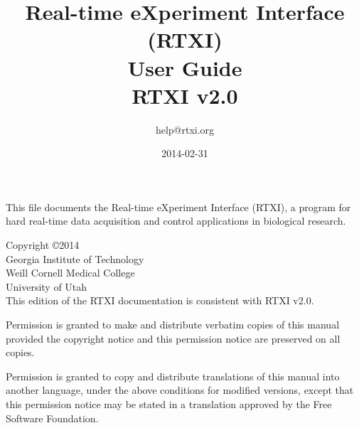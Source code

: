 \documentclass[twoside,letter]{refrep}
\title{Real-time eXperiment Interface (RTXI) \\User Guide\\
{\large RTXI v2.0}}
\author{help@rtxi.org}
\date{2014-02-31}
\begin{document}
\maketitle

This file documents the Real-time eXperiment Interface (RTXI), a program for hard real-time data acquisition and control applications in biological research.

Copyright \copyright 2014\\
Georgia Institute of Technology\\
Weill Cornell Medical College\\
University of Utah\\

This edition of the RTXI documentation is consistent with RTXI v2.0.

Permission is granted to make and distribute verbatim copies of this manual provided the copyright notice and this permission notice are preserved on all copies.

Permission is granted to copy and distribute translations of this manual into another language, under the above conditions for modified versions, except that this permission notice may be stated in a translation approved by the Free Software Foundation.

\tableofcontents

\newpage









 












\end{document}
